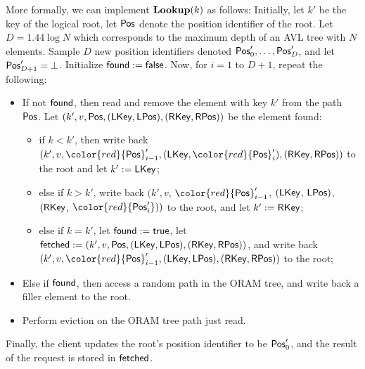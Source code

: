 \documentclass[11pt]{article}
\begin{document}
More formally, we can implement ${\bf Lookup}(k)$
as follows:
Initially, let $k'$ be the key of 
the logical root, let ${\sf Pos}$ denote
the position identifier of the root.
Let $D = 1.44 \log N$ which corresponds
to the maximum depth of an AVL tree with 
$N$ elements.
Sample $D$ new position identifiers
denoted ${\sf Pos}'_0, \ldots, {\sf Pos}'_D$, and let ${\sf Pos}'_{D+1} = \bot$.
Initialize ${\sf found} := {\sf false}$.
Now, 
for $i = 1$ to $D + 1$, repeat the  
following:
\begin{itemize} 
\item 
If not ${\sf found}$, then 
read and remove the element with key $k'$ from 
 the path ${\sf Pos}$. 
Let $(k', v, {\sf Pos}, ({\sf LKey}, {\sf LPos}), 
({\sf RKey}, {\sf RPos}))$
be the element found:
\begin{itemize}[leftmargin=5mm]
\item 
if $k < k'$, then 
write back
$(k', v, {\color{red} {\sf Pos}'_{i-1}}, ({\sf LKey}, 
{\color{red}{\sf Pos}'_i}), ({\sf RKey}, {\sf RPos}))$
to the root and let $k' := {\sf LKey}$; 
\item 
else 
if $k > k'$, 
write back
$(k', v$, ${\color{red}{\sf Pos}'_{i-1}}$,
 $({\sf LKey}$,
${\sf LPos})$,
$({\sf RKey}$,
${\color{red}{{\sf Pos}'_i}}))$ to the root, and let
$k' := {\sf RKey}$;
\item 
else if $k = k'$, let ${\sf found} := {\sf true}$, 
let ${\sf fetched} := (k', v, {\sf Pos}, ({\sf LKey}, {\sf LPos}), 
({\sf RKey}, {\sf RPos}))$, 
and write back 
$(k', v, {\color{red}{\sf Pos}'_{i-1}}, ({\sf LKey}, {\sf LPos}), 
({\sf RKey}, {\sf RPos}))$
to the root;
\end{itemize}
\item 
Else if ${\sf found}$, then 
access a random path in the ORAM tree, and write back a filler
element to the root.
\item 
Perform eviction on the ORAM tree path just read.  
\end{itemize}
Finally, the client updates the root's position identifier 
to be ${\sf Pos}'_0$, and the result of the request
is stored in ${\sf fetched}$.

\end{document}
